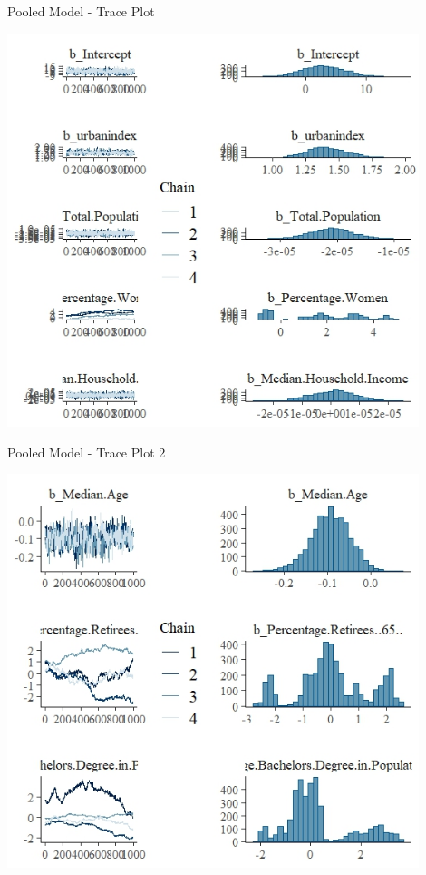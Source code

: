 \documentclass{beamer}
\begin{document}
\begin{frame}{Pooled Model - Trace Plot}

\includegraphics[width=0.9\textwidth]{plots/chains_pooled_model_default_priors_1.jpeg}

\end{frame}

\begin{frame}{Pooled Model - Trace Plot 2}

\includegraphics[width=0.9\textwidth]{plots/chains_pooled_model_default_priors_2.jpeg}

    
\end{frame}
\end{document}

